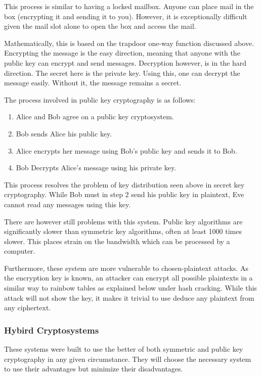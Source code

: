 				This process is similar to having a locked mailbox. 
				Anyone can place mail in the box (encrypting it and sending it to you). 
				However, it is exceptionally difficult given the mail slot alone to open the box and access the mail. 

				Mathematically, this is based on the trapdoor one-way function discussed above. 
				Encrypting the message is the easy direction, meaning that anyone with the public key can encrypt and send messages.
				Decryption however, is in the hard direction. 
				The secret here is the private key. 
				Using this, one can decrypt the message easily. 
				Without it, the message remains a secret. 

				The process involved in public key cryptography is as follows:
				\begin{enumerate}
					\item Alice and Bob agree on a public key cryptosystem. 
					\item Bob sends Alice his public key. 
					\item Alice encrypts her message using Bob's public key and sends it to Bob. 
					\item Bob Decrypts Alice's message using his private key. 
				\end{enumerate}

				This process resolves the problem of key distribution seen above in secret key cryptography. 
				While Bob must in step 2 send his public key in plaintext, Eve cannot read any messages using this key. 

				There are however still problems with this system. 
				Public key algorithms are significantly slower than symmetric key algorithms, often at least 1000 times slower. 
				This places strain on the bandwidth which can be processed by a computer. 

				Furthermore, these system are more vulnerable to chosen-plaintext attacks. 
				As the encryption key is known, an attacker can encrypt all possible plaintexts in a similar way to rainbow tables as explained below under hash cracking. 
				While this attack will not show the key, it makes it trivial to use deduce any plaintext from any ciphertext. 

			\subsubsection{Hybird Cryptosystems}
				These systems were built to use the better of both symmetric and public key cryptography in any given circumstance.
				They will choose the necessary system to use their advantages but minimize their disadvantages. 

